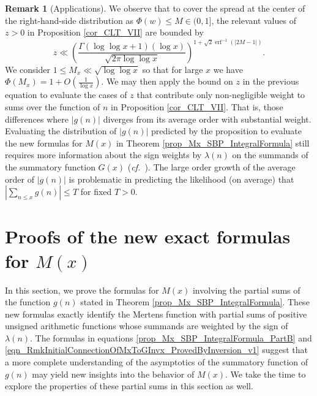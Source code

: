 \documentclass[11pt,reqno,a4letter]{article}
\newcommand{\hlocalref}[1]{\hyperref[#1]{\ref{#1}}}
\numberwithin{equation}{section}
\numberwithin{figure}{section}
\numberwithin{table}{section}
\newcommand{\cf}{\textit{cf.\ }}
\theoremstyle{plain}
\numberwithin{theorem}{section}
\theoremstyle{definition}
\newtheorem{remark}[theorem]{Remark}
\begin{document}
\begin{remark}[Applications]
We observe that to cover the spread at the center of the right-hand-side distribution 
as $\Phi(w) \leq M \in (0, 1]$, the relevant values of $z > 0$ in 
Proposition \hlocalref{cor_CLT_VII} are bounded by 
\[
z \ll \left(\frac{\Gamma(\log\log x + 1) (\log x)}{\sqrt{2\pi \log\log x}}\right)^{ 
     1 + \sqrt{2} \operatorname{erf}^{-1}\left(|2M-1|\right)}. 
\]
We consider $1 \leq M_x \ll \sqrt{\log\log x}$ so that for large $x$ we have
$\Phi(M_x) = 1 + O\left(\frac{1}{\log x}\right)$. 
We may then apply the bound on $z$ in the previous equation to evaluate 
the cases of $z$ that contribute only non-negligible weight to sums over 
the function of $n$ in Proposition \hlocalref{cor_CLT_VII}. 
That is, those differences where $|g(n)|$ diverges from its average 
order with substantial weight. 
Evaluating the distribution of $|g(n)|$ predicted by the proposition to 
evaluate the new formulas for $M(x)$ in 
Theorem \hlocalref{prop_Mx_SBP_IntegralFormula} 
still requires more information 
about the sign weights by $\lambda(n)$ on the summands of the summatory function $G(x)$ 
(\cf \cite{SIGN-CHANGES-OSCARITHFUNCTS}). 
The large order growth of the average order of $|g(n)|$ is problematic in 
predicting the likelihood (on average) that 
$\left\lvert \sum_{n \leq x} g(n) \right\rvert \leq T$ for fixed $T > 0$. 
\end{remark}

\section{Proofs of the new exact formulas for $M(x)$} 
\label{Section_KeyApplications} 
\label{Section_KeyApplications_NewExactFormulasForMx_FullSectionLabel} 

In this section, we prove the formulas for $M(x)$ involving the partial sums 
of the function $g(n)$ stated in 
Theorem \hlocalref{prop_Mx_SBP_IntegralFormula}. 
These new formulas exactly identify the Mertens function with partial sums of 
positive unsigned arithmetic functions whose summands are 
weighted by the sign of $\lambda(n)$. 
The formulas in equations 
\eqref{prop_Mx_SBP_IntegralFormula_PartB} and 
\eqref{eqn_RmkInitialConnectionOfMxToGInvx_ProvedByInversion_v1} 
suggest that a more complete understanding of the 
asymptotics of the summatory function of $g(n)$ 
may yield new insights into the behavior of $M(x)$. 
We take the time to explore the properties of these partial sums in 
this section as well. 
\end{document}
